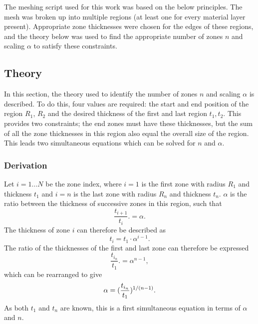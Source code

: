 The meshing script used for this work was based on the below principles. The mesh was broken up into multiple regions (at least one for every material layer present). Appropriate zone thicknesses were chosen for the edges of these regions, and the theory below was used to find the appropriate number of zones $n$ and scaling $\alpha$ to satisfy these constraints.

\subsection{Theory}

In this section, the theory used to identify the number of zones $n$ and scaling $\alpha$ is described. To do this, four values are required: the start and end position of the region $R_1$, $R_2$ and the desired thickness of the first and last region $t_1, t_2$. This provides two constraints; the end zones must have these thicknesses, but the sum of all the zone thicknesses in this region also equal the overall size of the region. This leads two simultaneous equations which can be solved for $n$ and $\alpha$.

\subsubsection{Derivation}
Let $i = 1...N$ be the zone index, where $i=1$ is the first zone with radius $R_1$ and thickness $t_1$ and $i=n$ is the last zone with radius $R_n$ and thickness $t_n$. $\alpha$ is the ratio between the thickness of successive zones in this region, such that 
\begin{equation}{\frac{t_{i+1}}{{t_i}}. = \alpha.}\end{equation}
The thickness of zone $i$ can therefore be described as
\begin{equation}{t_i = t_1 \cdot \alpha^{i-1}.}\end{equation}
The ratio of the thicknesses of the first and last zone can therefore be expressed 
\begin{equation}{\frac{t_{i_n}}{{t_1}}. = \alpha^{n-1},}\end{equation}
which can be rearranged to give
\begin{equation}{\label{eqn: SimEqn1} \alpha = ( \frac{t_{i_n}}{{t_1}} )^{1/(n-1)}.}\end{equation}
As both $t_1$ and $t_n$ are known, this is a first simultaneous equation in terms of $\alpha$ and $n$.

